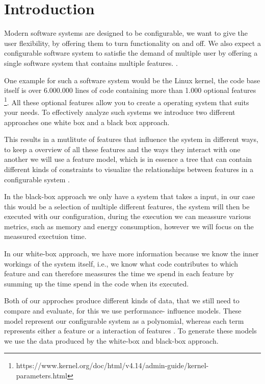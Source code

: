 \chapter{Introduction}\label{ch:introduction}

Modern software systems are designed to be configurable, we want to give the user flexibility, by offering them to turn functionality on 
and off. 
We also expect a configurable software system to satisfie the demand of multiple user by offering a single software system that 
contains multiple features. \cite{Feature-Oriented-Software-Product-Lines}. 

One example for such a software system would be the Linux kernel, the code base itself is over 6.000.000 lines of code containing more than 1.000 optional features 
\footnote{https://www.kernel.org/doc/html/v4.14/admin-guide/kernel-parameters.html}. 
All these optional features allow you to create a operating system that suits your needs. To effectively analyze such systems we introduce two different
approaches one white box and a black box approach.

This results in a mutlitute of features that influence the system in different ways, to keep a overview of all these features and the ways
they interact with one another we will use a feature model, which is in essence a tree that can contain different kinds of constraints
to visualize the relationships between features in a configurable system \cite{KangFeatureOrientedDomain1990}.

In the black-box approach we only have a system that takes a input, in our case this would be a selection of multiple different features, 
the system will then be executed with our configuration, during the execution we can meassure various metrics, such as memory and energy
consumption, however we will focus on the meassured exectuion time.

In our white-box approach, we have more information because we know the inner workings of the
system itself, i.e., we know what code contributes to which feature and can therefore meassures the time we spend in each feature by summing
up the time spend in the code when its executed.

Both of our approches produce different kinds of data, that we still need to compare and evaluate, for this we use performance-
influence models. These model represent our configurable system as a polynomial, whereas each term represents either a feature or a 
interaction of features \cite{Performance-influence-models-for-highly-configurable-systems}. To generate these models we use the data produced by the white-box and black-box approach.

